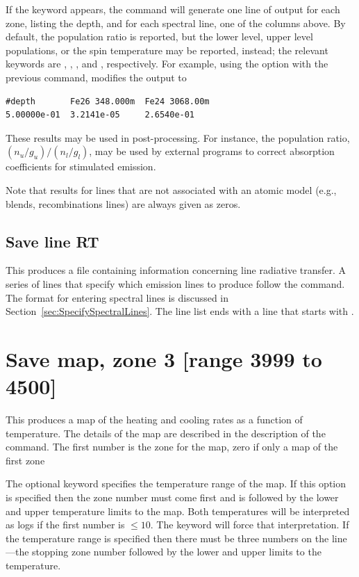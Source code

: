 If the  keyword appears, the command will generate one line of
output for each zone, listing the depth, and for each spectral line, one of the
columns above.
By default, the population ratio is reported, but the lower level, upper level
populations, or the spin temperature may be reported, instead; the relevant
keywords are , , , and
, respectively.
For example, using the  option with the previous command,
modifies the output to
%
\begin{verbatim}
#depth       Fe26 348.000m  Fe24 3068.00m
5.00000e-01  3.2141e-05     2.6540e-01
\end{verbatim}

These results may be used in post-processing.
For instance, the population ratio, $(n_u/g_u)/(n_l/g_l)$, may be used by
external programs to correct absorption coefficients for stimulated emission.

Note that results for lines that are not associated with an atomic model (e.g.,
blends, recombinations lines) are always given as zeros.

\subsection{Save line RT}

This produces a file containing information concerning line radiative
transfer. A series of lines that specify which emission lines to produce
follow the command. The format for entering spectral lines is discussed in
Section~\ref{sec:SpecifySpectralLines}. The line list ends with a line that
starts with .

\section{Save map, zone 3 [range 3999 to 4500]}

This produces a map of the heating and cooling rates as a function of
temperature.  The details of the map are described in the description of
the  command.
The first number is the zone
for the map, zero if only a map of the first zone

The optional keyword  specifies the temperature range of the map.
If this option is specified then the zone number must come first and is
followed by the lower and upper temperature limits to the map.
Both
temperatures will be interpreted as logs if the first number is $\leq 10$.
The keyword  will force that interpretation.  If the temperature range
is specified then there must be three numbers on the line---the stopping
zone number followed by the lower and upper limits to the temperature.

